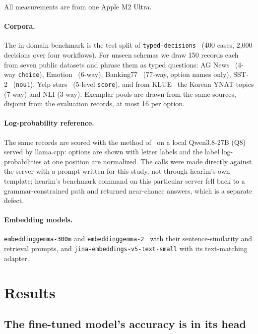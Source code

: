 \documentclass[11pt]{article}
\begin{document}
All measurements are from one Apple M2 Ultra.

\paragraph{Corpora.} The in-domain benchmark is the test split of
\texttt{typed-decisions}~\cite{td} (400 cases, 2{,}000 decisions over four
workflows). For unseen schemas we draw 150 records each from seven public
datasets and phrase them as typed questions: AG News~\cite{zhang} (4-way
\texttt{choice}), Emotion~\cite{emotion} (6-way), Banking77~\cite{banking}
(77-way, option names only), SST-2~\cite{sst} (\texttt{noul}), Yelp
stars~\cite{zhang} (5-level \texttt{score}), and from KLUE~\cite{klue} the
Korean YNAT topics (7-way) and NLI (3-way). Exemplar pools are drawn from the
same sources, disjoint from the evaluation records, at most 16 per option.

\paragraph{Log-probability reference.} The same records are scored with the
method of~\cite{hearim} on a local Qwen3.8-27B (Q8) served by llama.cpp:
options are shown with letter labels and the label log-probabilities at one
position are normalized. The calls were made directly against the server with
a prompt written for this study, not through hearim's own template; hearim's
benchmark command on this particular server fell back to a grammar-constrained
path and returned near-chance answers, which is a separate defect.

\paragraph{Embedding models.} \texttt{embeddinggemma-300m} and
\texttt{embeddinggemma-2}~\cite{eg} with their sentence-similarity and
retrieval prompts, and \texttt{jina-embeddings-v5-text-small} with its
text-matching adapter.

\section{Results}

\subsection{The fine-tuned model's accuracy is in its head}
\end{document}
